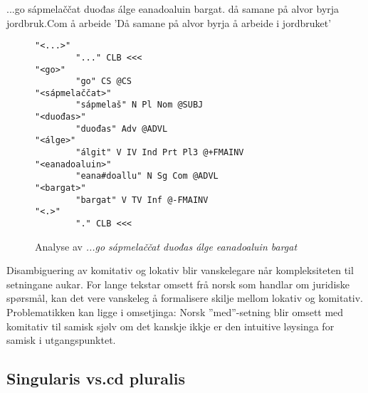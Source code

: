 \documentclass[a4paper,norsk]{article}
\begin{document}
\begin{example}\label{jordbruket}
\gll ...go sápmelaččat duođas álge eanadoaluin bargat.
     då samane {på alvor} byrja jordbruk.Com {å arbeide}
\glt 'Då samane på alvor byrja å arbeide i jordbruket'
\glend     
\end{example}

\begin{figure}[htbp]
\begin{center}
\begin{verbatim}
"<...>"
        "..." CLB <<<
"<go>"
        "go" CS @CS
"<sápmelaččat>"
        "sápmelaš" N Pl Nom @SUBJ
"<duođas>"
        "duođas" Adv @ADVL
"<álge>"
        "álgit" V IV Ind Prt Pl3 @+FMAINV
"<eanadoaluin>"
        "eana#doallu" N Sg Com @ADVL
"<bargat>"
        "bargat" V TV Inf @-FMAINV
"<.>"
        "." CLB <<<
\end{verbatim}
\caption{Analyse av \textit{...go sápmelaččat duođas álge eanadoaluin bargat}}
\label{comverbana}
\end{center}
\end{figure}



Disambiguering av komitativ og lokativ blir vanskelegare når kompleksiteten til setningane aukar. For lange tekstar omsett frå norsk som handlar om juridiske spørsmål, kan det vere vanskeleg å formalisere skilje mellom lokativ og komitativ. Problematikken kan ligge i omsetjinga: Norsk ''med''-setning blir omsett med komitativ til samisk sjølv om det kanskje ikkje er den intuitive løysinga for samisk i utgangspunktet. %




\subsection{Singularis vs.cd pluralis}
\end{document}
